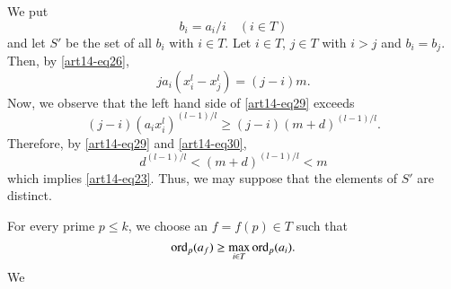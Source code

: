 We put
$$
b_{i}=a_{i}/i\quad (i\in T)
$$
and let $S'$ be the set of all $b_{i}$ with $i\in T$. Let $i\in T$, $j\in T$ with $i>j$ and $b_{i}=b_{j}$. Then, by \eqref{art14-eq26},
\begin{equation}
ja_{i}(x^{l}_{i}-x^{l}_{j})=(j-i)m.\label{art14-eq29}
\end{equation}
Now, we observe that the left hand side of \eqref{art14-eq29} exceeds
\begin{equation}
(j-i)(a_{i}x^{l}_{i})^{(l-1)/l}\geq (j-i)(m+d)^{(l-1)/l}.\label{art14-eq30}
\end{equation}
Therefore, by \eqref{art14-eq29} and \eqref{art14-eq30},
$$
d^{(l-1)/l}<(m+d)^{(l-1)/l}<m
$$
which implies \eqref{art14-eq23}. Thus, we may suppose that the elements of $S'$ are distinct.

For every prime $p\leq k$, we choose an $f=f(p)\in T$ such that 
$$
\operatorname{ord}_{p}(a_{f})\geq \max\limits_{i\in T}\operatorname{ord}_{p}(a_{i}).
$$
We\pageoriginale
